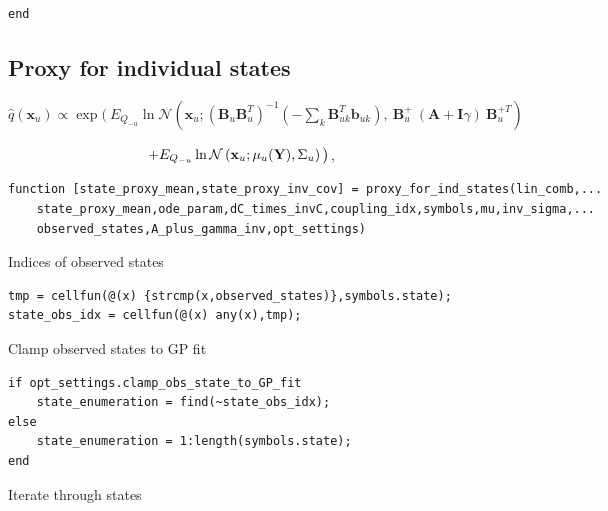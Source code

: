 \color{RoyalPurple}\begin{verbatim}
end
\end{verbatim}
\color{black}
\begin{par}
\section{ Proxy for individual states }
\end{par} \vspace{1em}
\begin{par}
$\hat{q}(\mathbf{x}_u) \propto \exp\big( ~ E_{Q_{-u}} \ln \mathcal{N}\left(\mathbf{x}_u ; \left( \mathbf{B}_{u} \mathbf{B}_{u}^T \right)^{-1} \left( - \sum_k \mathbf{B}_{uk}^T \mathbf{b}_{uk} \right), ~\mathbf{B}_{u}^{+} ~ (\mathbf{A} + \mathbf{I}\gamma) ~ \mathbf{B}_u^{+T} \right)$
\end{par} \vspace{1em}
\begin{par}
$\qquad \qquad \qquad \qquad \qquad + E_{Q_{-u}} \ln \mathcal{N}\left(\mathbf{x}_u ; \boldmath\mu_u(\mathbf{Y}), \Sigma_u \right) \big)$,
\end{par} \vspace{1em}
\color{RoyalPurple}\begin{verbatim}
function [state_proxy_mean,state_proxy_inv_cov] = proxy_for_ind_states(lin_comb,...
    state_proxy_mean,ode_param,dC_times_invC,coupling_idx,symbols,mu,inv_sigma,...
    observed_states,A_plus_gamma_inv,opt_settings)
\end{verbatim}
\color{black}
\begin{par}
Indices of observed states
\end{par} \vspace{1em}
\color{RoyalPurple}\begin{verbatim}
tmp = cellfun(@(x) {strcmp(x,observed_states)},symbols.state);
state_obs_idx = cellfun(@(x) any(x),tmp);
\end{verbatim}
\color{black}
\begin{par}
Clamp observed states to GP fit
\end{par} \vspace{1em}
\color{RoyalPurple}\begin{verbatim}
if opt_settings.clamp_obs_state_to_GP_fit
    state_enumeration = find(~state_obs_idx);
else
    state_enumeration = 1:length(symbols.state);
end
\end{verbatim}
\color{black}
\begin{par}
Iterate through states
\end{par} \vspace{1em}
